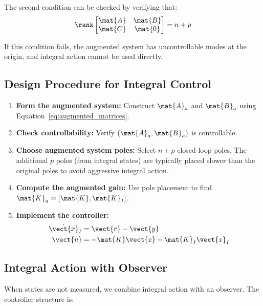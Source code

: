 The second condition can be checked by verifying that:
\begin{equation}
\rank\begin{bmatrix} \mat{A} & \mat{B} \\ \mat{C} & \mat{0} \end{bmatrix} = n + p
\label{eq:transmission_zero_check}
\end{equation}

If this condition fails, the augmented system has uncontrollable modes at the origin, and integral action cannot be used directly.

\subsection{Design Procedure for Integral Control}

\begin{enumerate}
    \item \textbf{Form the augmented system:} Construct $\mat{A}_a$ and $\mat{B}_a$ using Equation~\eqref{eq:augmented_matrices}.

    \item \textbf{Check controllability:} Verify $(\mat{A}_a, \mat{B}_a)$ is controllable.

    \item \textbf{Choose augmented system poles:} Select $n + p$ closed-loop poles. The additional $p$ poles (from integral states) are typically placed slower than the original poles to avoid aggressive integral action.

    \item \textbf{Compute the augmented gain:} Use pole placement to find $\mat{K}_a = [\mat{K}, \mat{K}_I]$.

    \item \textbf{Implement the controller:}
    \begin{align}
    \dot{\vect{x}}_I &= \vect{r} - \vect{y} \\
    \vect{u} &= -\mat{K}\vect{x} - \mat{K}_I\vect{x}_I
    \end{align}
\end{enumerate}

\subsection{Integral Action with Observer}

When states are not measured, we combine integral action with an observer. The controller structure is:

